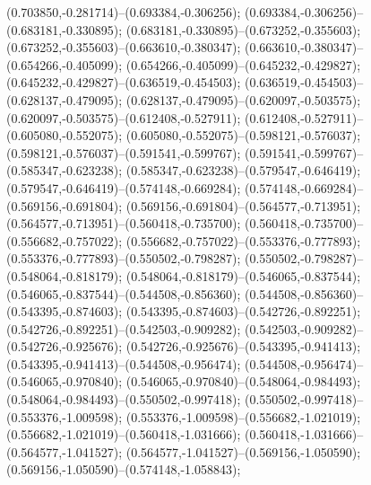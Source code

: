  (0.703850,-0.281714)--(0.693384,-0.306256);
 (0.693384,-0.306256)--(0.683181,-0.330895);
 (0.683181,-0.330895)--(0.673252,-0.355603);
 (0.673252,-0.355603)--(0.663610,-0.380347);
 (0.663610,-0.380347)--(0.654266,-0.405099);
 (0.654266,-0.405099)--(0.645232,-0.429827);
 (0.645232,-0.429827)--(0.636519,-0.454503);
 (0.636519,-0.454503)--(0.628137,-0.479095);
 (0.628137,-0.479095)--(0.620097,-0.503575);
 (0.620097,-0.503575)--(0.612408,-0.527911);
 (0.612408,-0.527911)--(0.605080,-0.552075);
 (0.605080,-0.552075)--(0.598121,-0.576037);
 (0.598121,-0.576037)--(0.591541,-0.599767);
 (0.591541,-0.599767)--(0.585347,-0.623238);
 (0.585347,-0.623238)--(0.579547,-0.646419);
 (0.579547,-0.646419)--(0.574148,-0.669284);
 (0.574148,-0.669284)--(0.569156,-0.691804);
 (0.569156,-0.691804)--(0.564577,-0.713951);
 (0.564577,-0.713951)--(0.560418,-0.735700);
 (0.560418,-0.735700)--(0.556682,-0.757022);
 (0.556682,-0.757022)--(0.553376,-0.777893);
 (0.553376,-0.777893)--(0.550502,-0.798287);
 (0.550502,-0.798287)--(0.548064,-0.818179);
 (0.548064,-0.818179)--(0.546065,-0.837544);
 (0.546065,-0.837544)--(0.544508,-0.856360);
 (0.544508,-0.856360)--(0.543395,-0.874603);
 (0.543395,-0.874603)--(0.542726,-0.892251);
 (0.542726,-0.892251)--(0.542503,-0.909282);
 (0.542503,-0.909282)--(0.542726,-0.925676);
 (0.542726,-0.925676)--(0.543395,-0.941413);
 (0.543395,-0.941413)--(0.544508,-0.956474);
 (0.544508,-0.956474)--(0.546065,-0.970840);
 (0.546065,-0.970840)--(0.548064,-0.984493);
 (0.548064,-0.984493)--(0.550502,-0.997418);
 (0.550502,-0.997418)--(0.553376,-1.009598);
 (0.553376,-1.009598)--(0.556682,-1.021019);
 (0.556682,-1.021019)--(0.560418,-1.031666);
 (0.560418,-1.031666)--(0.564577,-1.041527);
 (0.564577,-1.041527)--(0.569156,-1.050590);
 (0.569156,-1.050590)--(0.574148,-1.058843);
